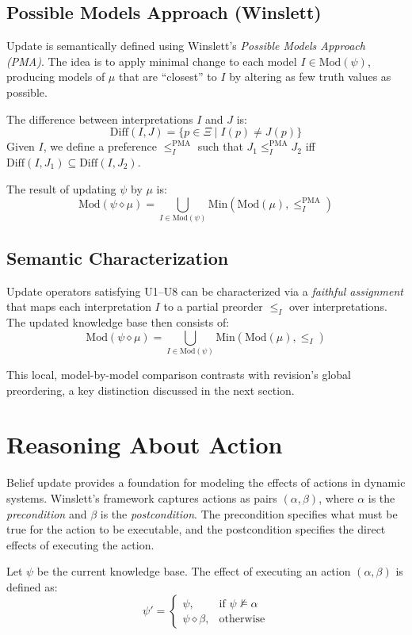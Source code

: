 \documentclass[runningheads]{llncs}
\begin{document}
\subsection{Possible Models Approach (Winslett)}

Update is semantically defined using Winslett’s \emph{Possible Models Approach (PMA)}. The idea is to apply minimal change to each model \( I \in \text{Mod}(\psi) \), producing models of \( \mu \) that are “closest” to \( I \) by altering as few truth values as possible.

The difference between interpretations \( I \) and \( J \) is:
\[
\text{Diff}(I, J) = \{ p \in \Xi \mid I(p) \neq J(p) \}
\]
Given \( I \), we define a preference \( \leq^{\text{PMA}}_I \) such that \( J_1 \leq^{\text{PMA}}_I J_2 \) iff \( \text{Diff}(I, J_1) \subseteq \text{Diff}(I, J_2) \).

The result of updating \( \psi \) by \( \mu \) is:
\[
\text{Mod}(\psi \diamond \mu) = \bigcup_{I \in \text{Mod}(\psi)} \text{Min}(\text{Mod}(\mu), \leq^{\text{PMA}}_I)
\]

\subsection{Semantic Characterization}

Update operators satisfying U1–U8 can be characterized via a \emph{faithful assignment} that maps each interpretation \( I \) to a partial preorder \( \leq_I \) over interpretations. The updated knowledge base then consists of:
\[
\text{Mod}(\psi \diamond \mu) = \bigcup_{I \in \text{Mod}(\psi)} \text{Min}(\text{Mod}(\mu), \leq_I)
\]

This local, model-by-model comparison contrasts with revision’s global preordering, a key distinction discussed in the next section.

\section{Reasoning About Action}

Belief update provides a foundation for modeling the effects of actions in dynamic systems. Winslett’s framework captures actions as pairs \( (\alpha, \beta) \), where \( \alpha \) is the \emph{precondition} and \( \beta \) is the \emph{postcondition}. The precondition specifies what must be true for the action to be executable, and the postcondition specifies the direct effects of executing the action.

Let \( \psi \) be the current knowledge base. The effect of executing an action \( (\alpha, \beta) \) is defined as:
\[
\psi' =
\begin{cases}
\psi, & \text{if } \psi \not\models \alpha \\
\psi \diamond \beta, & \text{otherwise}
\end{cases}
\]
\end{document}
